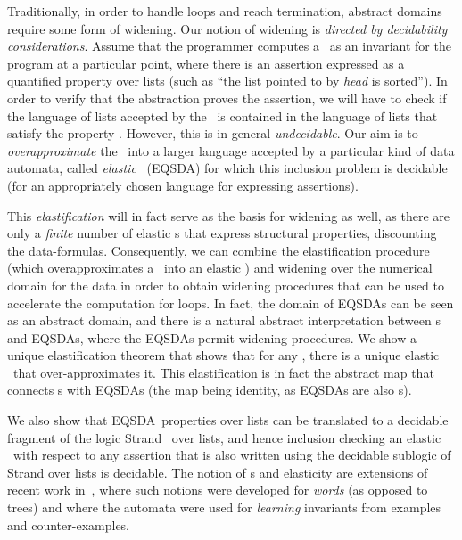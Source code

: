 \documentclass{llncs}
\newcommand{\EQSDA}{\mbox{\sc EQSDA}}
\begin{document}
Traditionally, in order to handle loops and reach termination, abstract domains require some form of widening.
Our notion of widening is \emph{directed by decidability considerations}. Assume that the programmer computes
a \QSDA\ as an invariant for the program at a particular point, where there is an assertion expressed as
a quantified property  over lists (such as  ``the list pointed to by \emph{head} is sorted'').
In order to verify that the abstraction proves the assertion, we will have to check if the language of lists
accepted by the \QSDA\ is contained in the language of lists that satisfy the property . However, this is in
general \emph{undecidable}. Our aim is to \emph{overapproximate} the \QSDA\ into a larger language accepted
by a particular kind of data automata, called  {\em elastic} \QSDA\ (\EQSDA) for which this inclusion problem is
decidable (for an appropriately chosen language for expressing assertions).



This \emph{elastification} will in fact serve as the basis for widening as well, as there are only a \emph{finite} number of
elastic \QSDA s that express structural properties, discounting the data-formulas. Consequently, we
can combine the elastification procedure (which overapproximates a \QSDA\ into an elastic \QSDA) and
widening over the numerical domain for the data in order to obtain widening procedures that can be
used to accelerate the computation for loops. In fact, the domain of \EQSDA s can be seen as an abstract
domain, and there is a natural abstract interpretation between \QSDA s and \EQSDA s, where the \EQSDA s permit
widening procedures. We show a unique elastification theorem that shows
that for any \QSDA, there is a unique elastic \QSDA\ that over-approximates it. This elastification is in fact
the abstract map  that connects \QSDA s with \EQSDA s (the  map being identity, as \EQSDA s are also
\QSDA s).



We also show that \EQSDA\ properties over lists can be translated to a decidable fragment of the logic {\sc Strand}~\cite{popl11} over lists, and hence
inclusion checking an elastic \QSDA\ with respect to any assertion that is also written using the decidable
sublogic of {\sc Strand} over lists is decidable. The notion of \QSDA s and elasticity are extensions
of recent work in~\cite{CAVQDA}, where such notions were developed for \emph{words}
(as opposed to trees) and where the automata were used for \emph{learning} invariants from examples and counter-examples.
\end{document}
